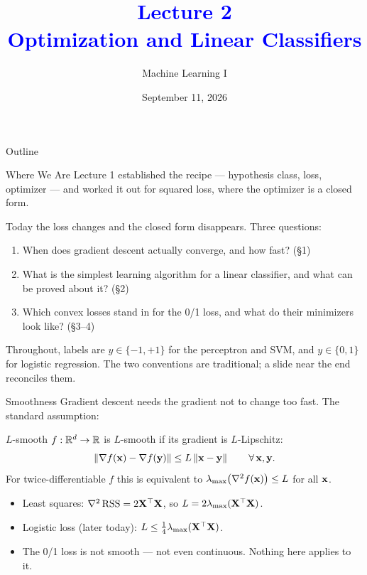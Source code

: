 \documentclass[11pt,aspectratio=169]{beamer}
\title{\textcolor{blue}{Lecture 2 \\ Optimization and Linear Classifiers}}
\subtitle{Machine Learning I}
\date{September 11, 2026}
\begin{document}
\begin{frame}[plain]
\maketitle
\end{frame}

\begin{frame}{Outline}
\tableofcontents
\end{frame}

\begin{frame}{Where We Are}
Lecture 1 established the recipe --- hypothesis class, loss, optimizer --- and worked it out for
squared loss, where the optimizer is a closed form.
\vspace{6pt}

Today the loss changes and the closed form disappears. Three questions:
\begin{enumerate}
  \item When does gradient descent actually converge, and how fast? \hfill (\S1)
  \item What is the simplest learning algorithm for a linear classifier, and what can be proved about it? \hfill (\S2)
  \item Which convex losses stand in for the 0/1 loss, and what do their minimizers look like? \hfill (\S3--4)
\end{enumerate}
\vspace{6pt}
Throughout, labels are $y\in\{-1,+1\}$ for the perceptron and SVM, and $y\in\{0,1\}$ for logistic
regression. The two conventions are traditional; a slide near the end reconciles them.
\end{frame}


\begin{frame}{Smoothness}
Gradient descent needs the gradient not to change too fast. The standard assumption:
\begin{block}{$L$-smooth}
$f:\mathbb{R}^d\to\mathbb{R}$ is $L$-smooth if its gradient is $L$-Lipschitz:
\[
\left\lVert \nabla f(\mathbf{x})-\nabla f(\mathbf{y}) \right\rVert\le L\left\lVert \mathbf{x}-\mathbf{y} \right\rVert\qquad\forall\,\mathbf{x},\mathbf{y} .
\]
For twice-differentiable $f$ this is equivalent to $\lambda_{\max}\bigl(\nabla^2f(\mathbf{x})\bigr)\le L$ for all $\mathbf{x}$.
\end{block}
\begin{itemize}
  \item Least squares: $\nabla^2\operatorname{RSS}=2\mathbf{X}^{\top}\mathbf{X}$, so $L=2\lambda_{\max}(\mathbf{X}^{\top}\mathbf{X})$.
  \item Logistic loss (later today): $L\le\tfrac14\lambda_{\max}(\mathbf{X}^{\top}\mathbf{X})$.
  \item The 0/1 loss is not smooth --- not even continuous. Nothing here applies to it.
\end{itemize}
\end{frame}
\end{document}
